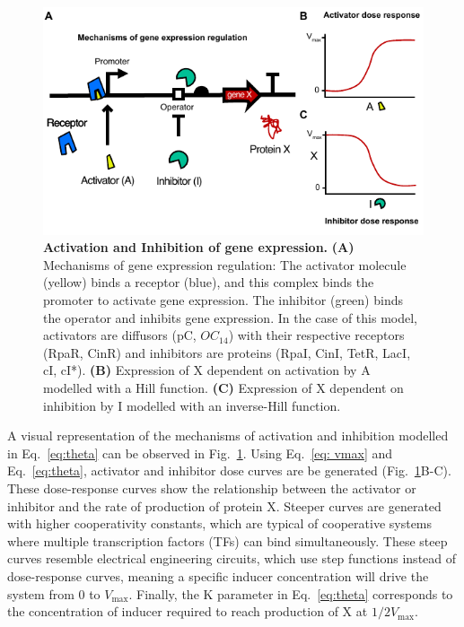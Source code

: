 \begin{figure}[H] %
    \centering
    \begin{adjustbox}{center}
        \includegraphics[width=1\textwidth]{chapters/Chapter 2/activation_inhibition2} %
    \end{adjustbox}
    \caption{\textbf{Activation and Inhibition of gene expression.} \textbf{(A)} Mechanisms of gene expression regulation:
    The activator molecule (yellow) binds a receptor (blue),
        and this complex binds the promoter to activate gene expression.
    The inhibitor (green) binds the operator and inhibits gene expression.
    In the case of this model, activators are diffusors (pC, $OC_{14}$) with their respective receptors (RpaR, CinR) and inhibitors are proteins (RpaI, CinI, TetR, LacI, cI, cI*).
    \textbf{(B)} Expression of X dependent on activation by A modelled with a Hill function.
    \textbf{(C)} Expression of X dependent on inhibition by I modelled with an inverse-Hill function.}
    \label{fig:activation_inhibition} %
\end{figure}

A visual representation of the mechanisms of activation and inhibition
modelled in Eq.~\ref{eq:theta} can be observed in Fig.~\ref{fig:activation_inhibition}.
Using Eq.~\ref{eq: vmax} and Eq.~\ref{eq:theta}, activator and inhibitor dose curves are be generated
(Fig.~\ref{fig:activation_inhibition}B-C).
These dose-response curves show the relationship between the activator or inhibitor and the rate of production of protein X.
Steeper curves are generated with higher cooperativity constants,
which are typical of cooperative systems where multiple transcription factors (TFs) can bind simultaneously.
These steep curves resemble electrical engineering circuits,
which use step functions instead of dose-response curves,
meaning a specific inducer concentration will drive the system from 0 to $V_{\max}$.
Finally,
the K parameter in Eq.~\ref{eq:theta} corresponds to the concentration of inducer
required to reach production of X at  $1/2 V_{\max}$.


